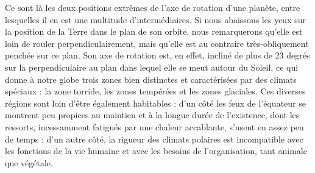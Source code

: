 \documentclass[a4paper, 11pt, oneside]{article}
\begin{document}
Ce sont là les deux positions extrêmes de l'axe de rotation d'une planète, entre lesquelles il en est une multitude d'intermédiaires. Si nous abaissons les yeux sur la position de la Terre dans le plan de son orbite, nous remarquerons qu'elle est loin de rouler perpendiculairement, mais qu'elle est au contraire très-obliquement penchée sur ce plan. Son axe de rotation est, en effet, incliné de plus de 23 degrés sur la perpendiculaire au plan dans lequel elle se meut autour du Soleil, ce qui donne à notre globe trois zones bien distinctes et caractérisées par des climats spéciaux : la zone torride, les zones tempérées et les zones glaciales. Ces diverses régions sont loin d'être également habitables : d'un côté les feux de l'équateur se montrent peu propices au maintien et à la longue durée de l'existence, dont les ressorts, incessamment fatigués par une chaleur accablante, s'usent en assez peu de temps ; d'un autre côté, la rigueur des climats polaires est incompatible avec les fonctions de la vie humaine et avec les besoins de l'organisation, tant animale que végétale.
\end{document}
